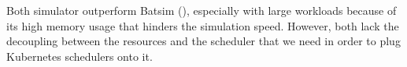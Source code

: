 Both simulator outperform Batsim (\cite{10.1007/978-3-319-73353-1_12}),
especially with large workloads because of its high memory usage that hinders
the simulation speed.  However, both lack the decoupling between the resources
and the scheduler that we need in order to plug Kubernetes schedulers onto it.

%
%
%
%
%
%
%
